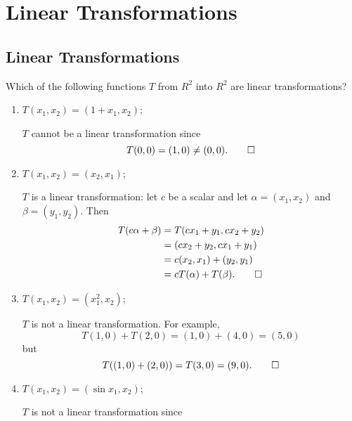 \chapter{Linear Transformations}

\section{Linear Transformations}

 Which of the following functions $T$ from $R^2$ into $R^2$
are linear transformations?
\begin{enumerate}
\item $T(x_1, x_2) = (1 + x_1, x_2)$;
  \begin{solution}
    $T$ cannot be a linear transformation since
    \begin{equation*}
      T(0, 0) = (1, 0) \neq (0, 0). \qedhere
    \end{equation*}
  \end{solution}
\item $T(x_1, x_2) = (x_2, x_1)$;
  \begin{solution}
    $T$ is a linear transformation: let $c$ be a scalar and let
    $\alpha = (x_1, x_2)$ and $\beta = (y_1, y_2)$. Then
    \begin{align*}
      T(c\alpha + \beta)
      &= T(cx_1 + y_1, cx_2 + y_2) \\
      &= (cx_2 + y_2, cx_1 + y_1) \\
      &= c(x_2, x_1) + (y_2, y_1) \\
      &= cT(\alpha) + T(\beta). \qedhere
    \end{align*}
  \end{solution}
\item $T(x_1, x_2) = (x_1^2, x_2)$;
  \begin{solution}
    $T$ is not a linear transformation. For example,
    \begin{equation*}
      T(1, 0) + T(2, 0) = (1, 0) + (4, 0) = (5, 0)
    \end{equation*}
    but
    \begin{equation*}
      T((1, 0) + (2, 0)) = T(3, 0) = (9, 0). \qedhere
    \end{equation*}
  \end{solution}
\item $T(x_1, x_2) = (\sin x_1, x_2)$;
  \begin{solution}
    $T$ is not a linear transformation since
    \begin{equation*}

\end{equation*}
\end{solution}
\end{enumerate}
